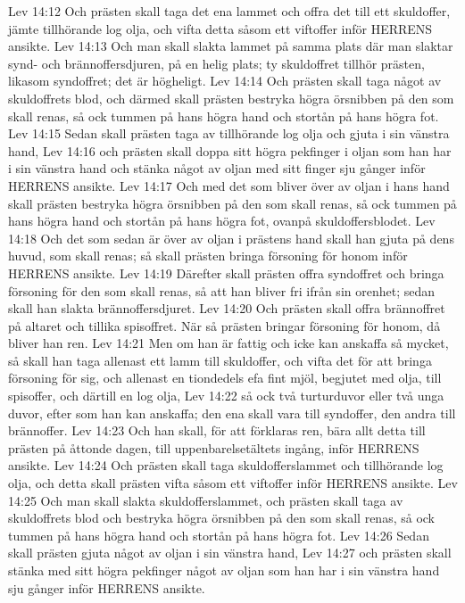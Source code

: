 Lev 14:12  Och prästen skall taga det ena lammet och offra det till ett skuldoffer, jämte tillhörande log olja, och vifta detta såsom ett viftoffer inför HERRENS ansikte.
Lev 14:13  Och man skall slakta lammet på samma plats där man slaktar synd- och brännoffersdjuren, på en helig plats; ty skuldoffret tillhör prästen, likasom syndoffret; det är högheligt.
Lev 14:14  Och prästen skall taga något av skuldoffrets blod, och därmed skall prästen bestryka högra örsnibben på den som skall renas, så ock tummen på hans högra hand och stortån på hans högra fot.
Lev 14:15  Sedan skall prästen taga av tillhörande log olja och gjuta i sin vänstra hand,
Lev 14:16  och prästen skall doppa sitt högra pekfinger i oljan som han har i sin vänstra hand och stänka något av oljan med sitt finger sju gånger inför HERRENS ansikte.
Lev 14:17  Och med det som bliver över av oljan i hans hand skall prästen bestryka högra örsnibben på den som skall renas, så ock tummen på hans högra hand och stortån på hans högra fot, ovanpå skuldoffersblodet.
Lev 14:18  Och det som sedan är över av oljan i prästens hand skall han gjuta på dens huvud, som skall renas; så skall prästen bringa försoning för honom inför HERRENS ansikte.
Lev 14:19  Därefter skall prästen offra syndoffret och bringa försoning för den som skall renas, så att han bliver fri ifrån sin orenhet; sedan skall han slakta brännoffersdjuret.
Lev 14:20  Och prästen skall offra brännoffret på altaret och tillika spisoffret. När så prästen bringar försoning för honom, då bliver han ren.
Lev 14:21  Men om han är fattig och icke kan anskaffa så mycket, så skall han taga allenast ett lamm till skuldoffer, och vifta det för att bringa försoning för sig, och allenast en tiondedels efa fint mjöl, begjutet med olja, till spisoffer, och därtill en log olja,
Lev 14:22  så ock två turturduvor eller två unga duvor, efter som han kan anskaffa; den ena skall vara till syndoffer, den andra till brännoffer.
Lev 14:23  Och han skall, för att förklaras ren, bära allt detta till prästen på åttonde dagen, till uppenbarelsetältets ingång, inför HERRENS ansikte.
Lev 14:24  Och prästen skall taga skuldofferslammet och tillhörande log olja, och detta skall prästen vifta såsom ett viftoffer inför HERRENS ansikte.
Lev 14:25  Och man skall slakta skuldofferslammet, och prästen skall taga av skuldoffrets blod och bestryka högra örsnibben på den som skall renas, så ock tummen på hans högra hand och stortån på hans högra fot.
Lev 14:26  Sedan skall prästen gjuta något av oljan i sin vänstra hand,
Lev 14:27  och prästen skall stänka med sitt högra pekfinger något av oljan som han har i sin vänstra hand sju gånger inför HERRENS ansikte.
